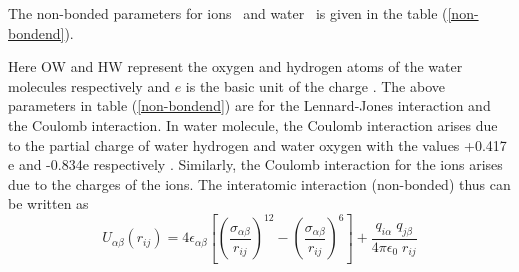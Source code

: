 \begin{sloppypar}
 The non-bonded parameters for ions~\citep{kaminski2001evaluation} and water~ \citep{jorgensen1983comparison} is given in the table (\ref{non-bondend}).
 
\begin{table}[H]
\centering
\caption[Force-field (non-bonded) parameters for ions and TIP3P water.]{Force-field (non-bonded) parameters for ions (halide and alkali) and TIP3P water.}
\label{non-bondend}
\end{table}
\noindent Here OW and HW represent the oxygen and hydrogen atoms of the water molecules respectively and $e$ is the basic unit of the charge . The above parameters in table   (\ref{non-bondend}) are for the Lennard-Jones interaction and the Coulomb interaction. In water molecule, the Coulomb interaction arises due to the partial charge of water hydrogen and water oxygen with the
values +0.417 e and -0.834e respectively \citep{jorgensen1983comparison}. Similarly, the Coulomb interaction for the ions   arises due to the  charges of the ions. The interatomic interaction  (non-bonded) thus can be written as
\begin{equation}
U_{\alpha\beta}(r_{ij}) = 4\epsilon_{\alpha \beta}\left[\left(\frac{\sigma_{\alpha\beta}}{r_{ij}}\right)^{12} - \left(\frac{\sigma_{\alpha\beta}}{r_{ij}}\right)^6\right] +  \frac{q_{i\alpha}\;q_{j\beta}}{4\pi\epsilon_0\;r_{ij}}

\end{equation}
\end{sloppypar}
